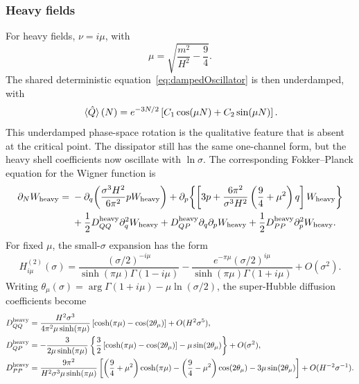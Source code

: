 \documentclass{article}
\numberwithin{equation}{section}
\begin{document}
	\subsubsection{Heavy fields}

	For heavy fields, \(\nu=i\mu\), with
	\begin{equation}
		\mu=\sqrt{\frac{m^2}{H^2}-\frac94}.
	\end{equation}
	The shared deterministic equation~\eqref{eq:dampedOscillator} is then underdamped, with
	\begin{equation}
		\ev*{\hat Q}(N)=e^{-3N/2} \left[ C_1\cos(\mu N)+C_2\sin(\mu N) \right].
	\end{equation}
	This underdamped phase-space rotation is the qualitative feature that is absent at the critical point. The dissipator still has the same one-channel form, but the heavy shell coefficients now oscillate with \(\ln\sigma\). The corresponding Fokker--Planck equation for the Wigner function is
	\begin{align}
		\partial_N W_{\rm heavy}
		={}&
		-\partial_q\!\left(
		\frac{\sigma^3H^2}{6\pi^2}pW_{\rm heavy}
		\right)
		+
		\partial_p\!\left\{
		\left[
		3p+\frac{6\pi^2}{\sigma^3H^2}
		\left(\frac94+\mu^2\right)q
		\right]W_{\rm heavy}
		\right\}
		\nonumber
		\\
		&+\frac12D^{\rm heavy}_{QQ}\partial_q^2W_{\rm heavy}
		+D^{\rm heavy}_{QP}\partial_q\partial_pW_{\rm heavy}
		+\frac12D^{\rm heavy}_{PP}\partial_p^2W_{\rm heavy}.
		\label{eq:FPHeavyMain}
	\end{align}
	For fixed \(\mu\), the small-\(\sigma\) expansion has the form
	\begin{equation}
		H_{i\mu}^{(2)}(\sigma)
		=
		\frac{(\sigma/2)^{-i\mu}}{\sinh(\pi\mu)\Gamma(1-i\mu)}
		-\frac{e^{-\pi\mu}(\sigma/2)^{i\mu}}{\sinh(\pi\mu)\Gamma(1+i\mu)}
		+O(\sigma^2).
	\end{equation}
	Writing \(\theta_\mu(\sigma)=\arg\Gamma(1+i\mu)-\mu\ln(\sigma/2)\), the super-Hubble diffusion coefficients become
	\begin{align}
		D_{QQ}^{\rm heavy}
		&=
		\frac{H^2\sigma^3}{4\pi^2\mu\sinh(\pi\mu)}
		\left[
		\cosh(\pi\mu)-\cos(2\theta_\mu)
		\right]
		+O(H^2\sigma^5),
		\label{eq:DQQheavy}
		\\
		D_{QP}^{\rm heavy}
		&=
		-\frac{3}{2\mu\sinh(\pi\mu)}
		\left\{
		\frac32\left[\cosh(\pi\mu)-\cos(2\theta_\mu)\right]
		-\mu\sin(2\theta_\mu)
		\right\}
		+O(\sigma^2),
		\nonumber\\
		D_{PP}^{\rm heavy}
		&=
		\frac{9\pi^2}{H^2\sigma^3\mu\sinh(\pi\mu)}
		\left[
		\left(\frac94+\mu^2\right)\cosh(\pi\mu)
		-\left(\frac94-\mu^2\right)\cos(2\theta_\mu)
		-3\mu\sin(2\theta_\mu)
		\right]
		+O(H^{-2}\sigma^{-1}).
		\label{eq:HeavyDiffusionSuperHubbleMain}
	\end{align}
\end{document}
